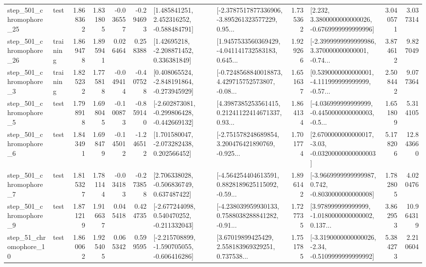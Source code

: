 \begin{tabular}{llrrrrllrlrr}
  step\_501\_chromophore\_25 &      test &      1.868362 &    1.831805 &     -0.036557 & -0.294693 &    [1.485841251, 2.452316252, -0.588484791] &  [-2.3787517877336906, -3.895261323577229, 0.95... &       1.735362 &   [2.232, 3.3800000000000026, -0.6769999999999996] &            3.040571 &          3.037314 \\
  step\_501\_chromophore\_26 &  training &      1.869478 &    1.895941 &      0.026464 &  0.258388 &     [1.42695218, -2.208871452, 0.336381849] &  [1.9457533560369429, -4.041141732583183, 0.645... &       1.929266 &  [-2.3999999999999986, 3.370000000000001, -0.74... &            3.874612 &          9.827049 \\
   step\_501\_chromophore\_3 &  training &      1.825232 &    1.775818 &     -0.049414 & -0.407528 &   [0.408065524, -2.848191864, -0.273945929] &  [-0.7248568840018873, 4.429715752573807, -0.08... &       1.651637 &  [0.5390000000000001, -4.111999999999999, -0.57... &            2.508442 &          9.077364 \\
   step\_501\_chromophore\_5 &      test &      1.798918 &    1.698045 &     -0.100873 & -0.859140 &  [-2.602873081, -0.299806428, -0.442669132] &  [4.3987385253561415, 0.21241122414671337, 0.93... &       1.864134 &  [-4.036999999999999, -0.4450000000000003, -0.5... &            1.651809 &          5.314105 \\
   step\_501\_chromophore\_6 &      test &      1.843491 &    1.698479 &     -0.145012 & -1.246512 &    [1.701580047, -2.073282438, 0.202566452] &  [-2.751578248689854, 3.200476421890769, -0.925... &       1.701774 &  [2.6700000000000017, -3.03, -0.03200000000000003] &            5.178206 &         12.843660 \\
   step\_501\_chromophore\_7 &      test &      1.815327 &    1.781144 &     -0.034183 & -0.273858 &    [2.706338028, -0.506836749, 0.637487422] &  [-4.564254404613591, 0.8828189625115092, -0.59... &       1.896142 &  [-3.9669999999999987, 0.742, -0.8030000000000008] &            1.782805 &          4.020476 \\
   step\_501\_chromophore\_9 &      test &      1.871219 &    1.916637 &      0.045418 &  0.424735 &   [-2.677244098, 0.540470252, -0.211332043] &  [-4.238039959930133, 0.7588038288841282, -0.91... &       1.727735 &  [3.978999999999999, -1.0180000000000002, 0.137... &            3.862953 &         10.964319 \\
   step\_51\_chromophore\_10 &      test &      1.860062 &    1.925405 &      0.065342 &  0.599595 &  [-2.215708899, -1.590705055, -0.606416286] &  [3.67019899425429, 2.558183969329251, 0.737538... &       1.751785 &  [-3.3190000000000026, -2.34, -0.5109999999999992] &            5.384273 &          2.210604 \\

\end{tabular}
